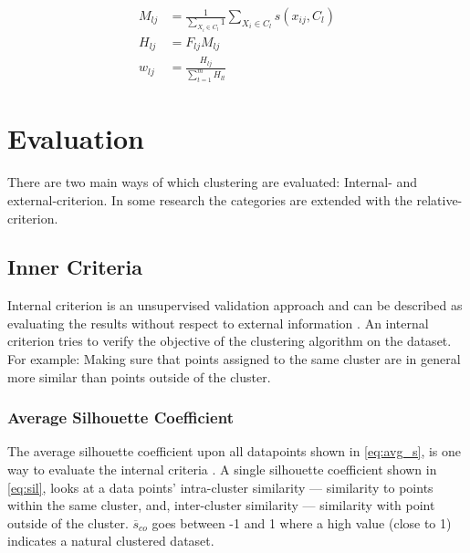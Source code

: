 \documentclass[../report.tex]{subfiles}
\begin{document}
\begin{align}
  M_{lj} &= \frac{1}{\sum_{X_i \in C_{l}}{1}} \sum_{X_i \in C_{l}}{s(x_{ ij }, C_l)} \\
\label{eq:intraJia}
 H_{ lj } &= F_{ lj} M_{ lj } \\
  w_{lj} & = \frac{H_{lj}}{\sum_{t = 1}^{m}{H_{lt}}}
\label{eq:Jiaweight}
\end{align}



\section{Evaluation}
There are two main ways of which clustering are evaluated: Internal- and external-criterion.\cite{manning2010introduction}
In some research the categories are extended with the relative-criterion.\cite{Halkidi2002}

\subsection{Inner Criteria} \label{sec:Internal}
Internal criterion is an unsupervised validation approach and can be described as evaluating the results without respect to external information \cite{Halkidi2002}. An internal criterion tries to verify the objective of the clustering algorithm on the dataset. For example: Making sure that points assigned to the same cluster are in general more similar than points outside of the cluster.

\subsubsection{Average Silhouette Coefficient}

The average silhouette coefficient upon all datapoints shown in \ref{eq:avg_s}, is one way to evaluate the internal criteria \cite{ROUSSEEUW198753}. A single silhouette coefficient shown in \ref{eq:sil}, looks at a data points' intra-cluster similarity --- similarity to points within the same cluster, and, inter-cluster similarity --- similarity with point outside of the cluster. $\overline{s}_{co}$ goes between -1 and 1 where a high value (close to 1) indicates a natural clustered dataset.
\end{document}
